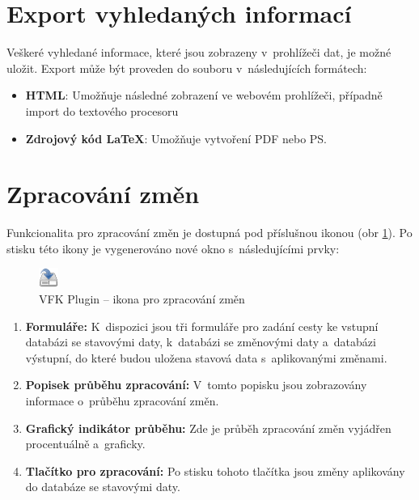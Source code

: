 \documentclass[a4paper,12pt,oneside]{book}
\newcommand{\latex}{\LaTeX}
\begin{document}
\clearpage
\section{Export vyhledaných informací}
Veškeré vyhledané informace, které jsou zobrazeny v~prohlížeči dat, je možné uložit. Export může být proveden do souboru v~následujících formátech:

\begin{itemize}
 \item \textbf{HTML}: Umožňuje následné zobrazení ve webovém prohlížeči, případně import do textového procesoru
 \item \textbf{Zdrojový kód \latex}: Umožňuje vytvoření PDF nebo PS.
\end{itemize}

\section{Zpracování změn}
Funkcionalita pro zpracování změn je dostupná pod příslušnou ikonou (obr \ref{l_ikona_zmen}). Po stisku této ikony je vygenerováno nové okno s~následujícími prvky:

\begin{figure}[htb]
\centering
\includegraphics[scale=0.9]{images/applyChanges.png}
\caption[VFK Plugin -- ikona pro zpracování změn]{VFK Plugin -- ikona pro zpracování změn}
\label{l_ikona_zmen}
\end{figure} 

\begin{enumerate} 
 \item \textbf{Formuláře:} K~dispozici jsou tři formuláře pro zadání cesty ke vstupní databázi se stavovými daty, k~databázi se změnovými daty a~databázi výstupní, do které budou uložena stavová data s~aplikovanými změnami.
 
 \item \textbf{Popisek průběhu zpracování:} V~tomto popisku jsou zobrazovány informace o~průběhu zpracování změn.
 
 \item \textbf{Grafický indikátor průběhu:} Zde je průběh zpracování změn vyjádřen procentuálně a~graficky.
 
 \item \textbf{Tlačítko pro zpracování:} Po stisku tohoto tlačítka jsou změny aplikovány do databáze se stavovými daty.
 
\end{enumerate}
\end{document}

